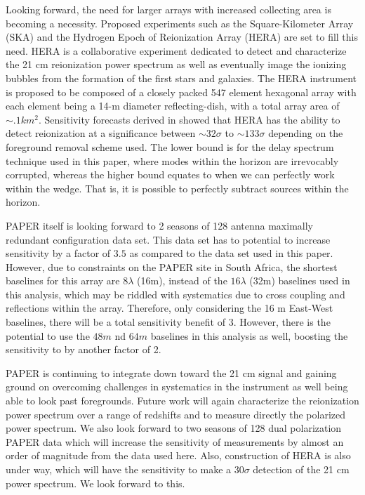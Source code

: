 \documentclass[twocolumn,numberedappendix]{emulateapj} \shorttitle{PSA64}
\begin{document}
Looking forward, the need for larger arrays with increased collecting area is
becoming a necessity. Proposed experiments such as the Square-Kilometer Array
(SKA) and the Hydrogen Epoch of Reionization Array (HERA) are set to fill this
need. HERA is a collaborative experiment dedicated to detect and characterize
the 21 cm reionization power spectrum as well as eventually image the ionizing bubbles
from the formation of the first stars and galaxies. The HERA instrument
is proposed to be composed of a closely packed 547 element hexagonal array 
\citep{pober_et_al2014} with each element being a 14-m diameter
reflecting-dish, with a total array area of $\sim.1km^{2}$. Sensitivity forecasts
derived in \citet{pober_et_al2014} showed that HERA has the ability to
detect reionization at a significance between $\sim32\sigma$ to $\sim133\sigma$
depending on the foreground removal scheme used. The lower bound is for the
delay spectrum technique used in this paper, where modes within the horizon are
irrevocably corrupted, whereas the higher bound equates to when we can perfectly
work within the wedge. That is, it is possible to perfectly subtract sources
within the horizon.

PAPER itself is looking forward to 2 seasons of 128 antenna maximally redundant
configuration data set. This data set has to potential to increase  sensitivity
by a factor of $3.5$ as compared to the data set used in this paper. However,
due to constraints on the PAPER site in South Africa, the shortest baselines for
this array are $8\lambda$ (16m), instead of the $16\lambda$ (32m) baselines used
in this analysis, which may be riddled with systematics due to cross coupling
and reflections within the array. Therefore, only considering the 16 m
East-West baselines, there will be a total sensitivity benefit of $3$. However,
there is the potential to use the $48m$ nd $64m$ baselines in this analysis as
well, boosting the sensitivity to by another factor of 2. 

PAPER is continuing to integrate down toward the 21 cm signal and gaining ground
on overcoming challenges in systematics in the instrument as well being able to
look past foregrounds. Future work will again characterize the reionization power
spectrum over a range of redshifts and to measure directly the polarized power
spectrum. We also look forward to two seasons of 128 dual polarization PAPER
data which will increase the sensitivity of measurements by almost an order of
magnitude from the data used here. Also, construction of HERA is also under way,
which will have the sensitivity to make a $30\sigma$ detection of the 21 cm power
spectrum. We look forward to this.
\end{document}
